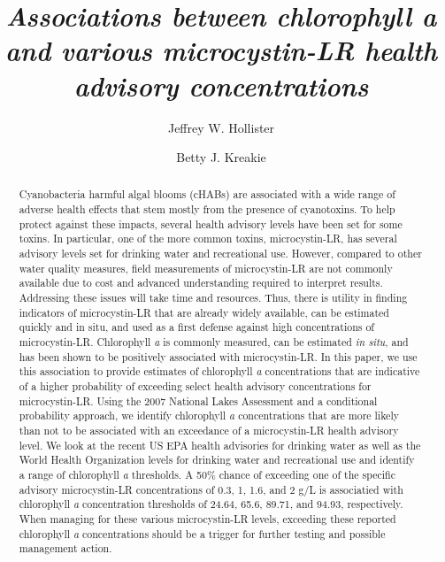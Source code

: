 \documentclass[10pt,a4paper,twocolumn]{article}
\begin{document}
\title{\textit{Associations between chlorophyll \emph{a} and various microcystin-LR
health advisory concentrations} }
\author[1]{Jeffrey W. Hollister}
\author[1]{Betty J. Kreakie}

\maketitle
\thispagestyle{fancy}

\begin{abstract}

Cyanobacteria harmful algal blooms (cHABs) are associated with a wide
range of adverse health effects that stem mostly from the presence of
cyanotoxins. To help protect against these impacts, several health
advisory levels have been set for some toxins. In particular, one of the
more common toxins, microcystin-LR, has several advisory levels set for
drinking water and recreational use. However, compared to other water
quality measures, field measurements of microcystin-LR are not commonly
available due to cost and advanced understanding required to interpret
results. Addressing these issues will take time and resources. Thus,
there is utility in finding indicators of microcystin-LR that are
already widely available, can be estimated quickly and in situ, and used
as a first defense against high concentrations of microcystin-LR.
Chlorophyll \emph{a} is commonly measured, can be estimated \emph{in
situ}, and has been shown to be positively associated with
microcystin-LR. In this paper, we use this association to provide
estimates of chlorophyll \emph{a} concentrations that are indicative of
a higher probability of exceeding select health advisory concentrations
for microcystin-LR. Using the 2007 National Lakes Assessment and a
conditional probability approach, we identify chlorophyll \emph{a}
concentrations that are more likely than not to be associated with an
exceedance of a microcystin-LR health advisory level. We look at the
recent US EPA health advisories for drinking water as well as the World
Health Organization levels for drinking water and recreational use and
identify a range of chlorophyll \emph{a} thresholds. A 50\% chance of
exceeding one of the specific advisory microcystin-LR concentrations of
0.3, 1, 1.6, and 2 g/L is associatied with chlorophyll \emph{a}
concentration thresholds of 24.64, 65.6, 89.71, and 94.93, respectively.
When managing for these various microcystin-LR levels, exceeding these
reported chlorophyll \emph{a} concentrations should be a trigger for
further testing and possible management action.

\end{abstract}
\end{document}
